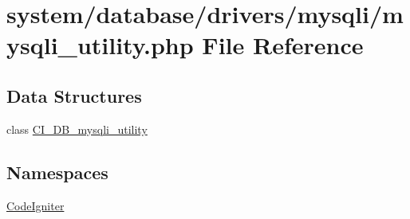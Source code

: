 \hypertarget{mysqli__utility_8php}{\section{system/database/drivers/mysqli/mysqli\-\_\-utility.php File Reference}
\label{mysqli__utility_8php}
}
\subsection*{Data Structures}
\begin{DoxyCompactItemize}
\item 
class \hyperlink{class_c_i___d_b__mysqli__utility}{C\-I\-\_\-\-D\-B\-\_\-mysqli\-\_\-utility}
\end{DoxyCompactItemize}
\subsection*{Namespaces}
\begin{DoxyCompactItemize}
\item 
\hyperlink{namespace_code_igniter}{Code\-Igniter}
\end{DoxyCompactItemize}
